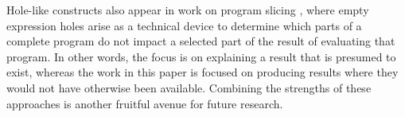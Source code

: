 




Hole-like constructs also appear in work on program slicing
\cite{DBLP:conf/icfp/PereraACL12,DBLP:journals/pacmpl/RicciottiSPC17}, where empty expression holes arise as a technical device to determine which parts of a complete program do not impact a selected part of the result of evaluating that program. In other words, the focus is on explaining a result that is presumed to exist, whereas the work in this paper is focused on producing results where they would not have otherwise been available. Combining the strengths of these approaches is another fruitful avenue for future research.

